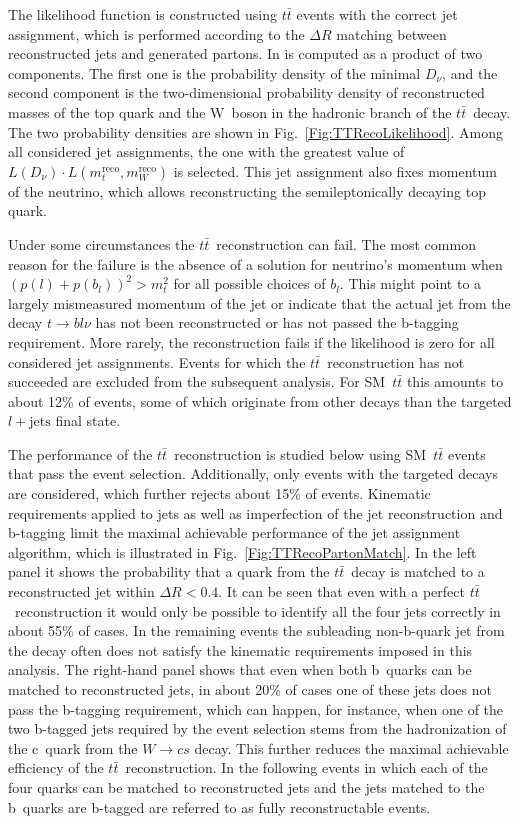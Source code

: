 The likelihood function is constructed using $t\bar t$ events with the correct jet assignment, which is performed according to the $\Delta R$ matching between reconstructed jets and generated partons.
In is computed as a product of two components.
The first one is the probability density of the minimal $D_{\nu}$, and the second component is the two-dimensional probability density of reconstructed masses of the top quark and the W~boson in the hadronic branch of the $t\bar t$~decay.
The two probability densities are shown in Fig.~\ref{Fig:TTRecoLikelihood}.
Among all considered jet assignments, the one with the greatest value of $L(D_{\nu}) \cdot L(m_{t}^\text{reco}, m_{W}^\text{reco})$ is selected.
This jet assignment also fixes momentum of the neutrino, which allows reconstructing the semileptonically decaying top quark.

Under some circumstances the $t\bar t$~reconstruction can fail.
The most common reason for the failure is the absence of a solution for neutrino's momentum when $(p(l) + p(b_l))^2 > m_t^2$ for all possible choices of $b_l$.
This might point to a largely mismeasured momentum of the jet or indicate that the actual jet from the decay $t \rightarrow bl\nu$ has not been reconstructed or has not passed the b-tagging requirement.
More rarely, the reconstruction fails if the likelihood is zero for all considered jet assignments.
Events for which the $t\bar t$~reconstruction has not succeeded are excluded from the subsequent analysis.
For SM~$t\bar t$ this amounts to about 12\% of events, some of which originate from other decays than the targeted $l + \text{jets}$ final state.

The performance of the $t\bar t$~reconstruction is studied below using SM~$t\bar t$ events that pass the event selection.
Additionally, only events with the targeted decays are considered, which further rejects about 15\% of events.
Kinematic requirements applied to jets as well as imperfection of the jet reconstruction and b-tagging limit the maximal achievable performance of the jet assignment algorithm, which is illustrated in Fig.~\ref{Fig:TTRecoPartonMatch}.
In the left panel it shows the probability that a quark from the $t\bar t$~decay is matched to a reconstructed jet within $\Delta R < 0.4$.
It can be seen that even with a perfect $t\bar t$~reconstruction it would only be possible to identify all the four jets correctly in about 55\% of cases.
In the remaining events the subleading non-b-quark jet from the decay often does not satisfy the kinematic requirements imposed in this analysis.
The right-hand panel shows that even when both b~quarks can be matched to reconstructed jets, in about 20\% of cases one of these jets does not pass the b-tagging requirement, which can happen, for instance, when one of the two b-tagged jets required by the event selection stems from the hadronization of the c~quark from the $W \rightarrow cs$ decay.
This further reduces the maximal achievable efficiency of the $t\bar t$~reconstruction.
In the following events in which each of the four quarks can be matched to reconstructed jets and the jets matched to the b~quarks are b-tagged are referred to as fully reconstructable events.


